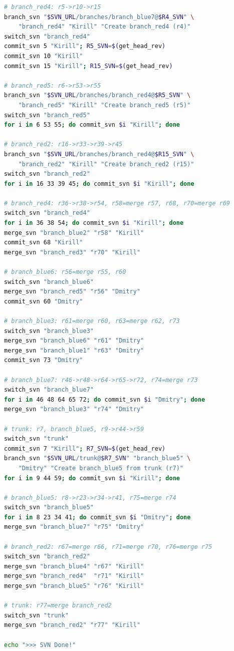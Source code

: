\documentclass[12pt,a4paper]{article}
\begin{document}
\begin{lstlisting}[language=bash]
# branch_red4: r5->r10->r15
branch_svn "$SVN_URL/branches/branch_blue7@$R4_SVN" \
    "branch_red4" "Kirill" "Create branch_red4 (r4)"
switch_svn "branch_red4"
commit_svn 5 "Kirill"; R5_SVN=$(get_head_rev)
commit_svn 10 "Kirill"
commit_svn 15 "Kirill"; R15_SVN=$(get_head_rev)

# branch_red5: r6->r53->r55
branch_svn "$SVN_URL/branches/branch_red4@$R5_SVN" \
    "branch_red5" "Kirill" "Create branch_red5 (r5)"
switch_svn "branch_red5"
for i in 6 53 55; do commit_svn $i "Kirill"; done

# branch_red2: r16->r33->r39->r45
branch_svn "$SVN_URL/branches/branch_red4@$R15_SVN" \
    "branch_red2" "Kirill" "Create branch_red2 (r15)"
switch_svn "branch_red2"
for i in 16 33 39 45; do commit_svn $i "Kirill"; done

# branch_red4: r36->r38->r54, r58=merge r57, r68, r70=merge r69
switch_svn "branch_red4"
for i in 36 38 54; do commit_svn $i "Kirill"; done
merge_svn "branch_blue2" "r58" "Kirill"
commit_svn 68 "Kirill"
merge_svn "branch_red3" "r70" "Kirill"

# branch_blue6: r56=merge r55, r60
switch_svn "branch_blue6"
merge_svn "branch_red5" "r56" "Dmitry"
commit_svn 60 "Dmitry"

# branch_blue3: r61=merge r60, r63=merge r62, r73
switch_svn "branch_blue3"
merge_svn "branch_blue6" "r61" "Dmitry"
merge_svn "branch_blue1" "r63" "Dmitry"
commit_svn 73 "Dmitry"

# branch_blue7: r46->r48->r64->r65->r72, r74=merge r73
switch_svn "branch_blue7"
for i in 46 48 64 65 72; do commit_svn $i "Dmitry"; done
merge_svn "branch_blue3" "r74" "Dmitry"

# trunk: r7, branch_blue5, r9->r44->r59
switch_svn "trunk"
commit_svn 7 "Kirill"; R7_SVN=$(get_head_rev)
branch_svn "$SVN_URL/trunk@$R7_SVN" "branch_blue5" \
    "Dmitry" "Create branch_blue5 from trunk (r7)"
for i in 9 44 59; do commit_svn $i "Kirill"; done

# branch_blue5: r8->r23->r34->r41, r75=merge r74
switch_svn "branch_blue5"
for i in 8 23 34 41; do commit_svn $i "Dmitry"; done
merge_svn "branch_blue7" "r75" "Dmitry"

# branch_red2: r67=merge r66, r71=merge r70, r76=merge r75
switch_svn "branch_red2"
merge_svn "branch_blue4" "r67" "Kirill"
merge_svn "branch_red4"  "r71" "Kirill"
merge_svn "branch_blue5" "r76" "Kirill"

# trunk: r77=merge branch_red2
switch_svn "trunk"
merge_svn "branch_red2" "r77" "Kirill"

echo ">>> SVN Done!"
\end{lstlisting}
\end{document}
